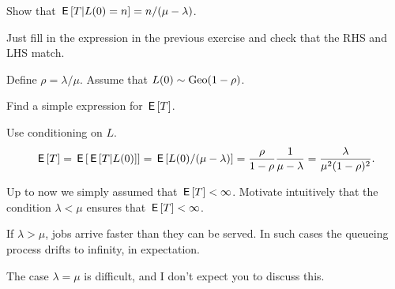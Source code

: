 \begin{exercise}[1]
Show that $\,\mathsf{E}\left[T|L(0)=n\right] = n/(\mu-\lambda)$.
\begin{solution}
Just fill in the expression in the previous exercise and check that the RHS and LHS match.
\end{solution}
\end{exercise}




Define $\rho=\lambda/\mu$. Assume that $L(0)\sim \mathrm{Geo}(1-\rho)$.
\begin{exercise}[1]
Find a simple expression for $\,\mathsf{E}\left[T\right]$.
\begin{solution}
Use conditioning on $L$.
  \begin{align*}
\,\mathsf{E}\left[T\right]
= \,\mathsf{E}\left[\,\mathsf{E}\left[T|L(0)\right]\right] = \,\mathsf{E}\left[L(0)/(\mu-\lambda)\right]  = \frac{\rho}{1-\rho} \frac{1}{\mu-\lambda} = \frac{\lambda}{\mu^2(1-\rho)^{2}}.
  \end{align*}
\end{solution}
\end{exercise}


\begin{exercise}[1]
Up to now we simply  assumed that $\,\mathsf{E}\left[T\right] < \infty$.   Motivate  intuitively that the condition $\lambda<\mu$ ensures that $\,\mathsf{E}\left[T\right] < \infty$.
\begin{solution}
If $\lambda>\mu$, jobs arrive faster than they can be served. In such cases the queueing process drifts to infinity, in expectation.

The case $\lambda=\mu$ is difficult, and I don't expect you to discuss this.
\end{solution}
\end{exercise}

